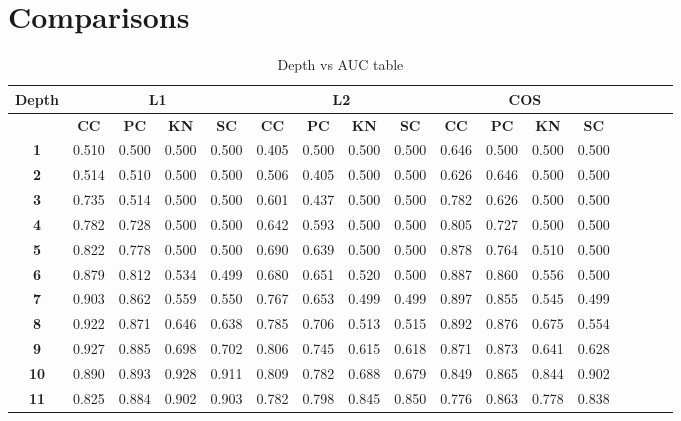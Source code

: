 \section{Comparisons}
\label{sec:comparisons}

\begin{table*}[!t]
\caption{Depth vs AUC table}
\label{comparisons:vowels}
\centering
\begin{tabular}{|c|c|c|c|c|c|c|c|c|c|c|c|c|c|c|c|c|}
\hline
\bfseries Depth & \multicolumn{4}{c|}{\textbf{L1}} & \multicolumn{4}{c|}{\textbf{L2}} & \multicolumn{4}{c|}{\textbf{COS}} \\
\hline
\bfseries  & \bfseries CC & \bfseries PC & \bfseries KN & \bfseries SC & \bfseries CC & \bfseries PC & \bfseries KN & \bfseries SC & \bfseries CC & \bfseries PC & \bfseries KN & \bfseries SC \\
\hline
\bfseries 1 & 0.510 & 0.500 & 0.500 & 0.500 & 0.405 & 0.500 & 0.500 & 0.500 & 0.646 & 0.500 & 0.500 & 0.500 \\
\hline\bfseries 2 & 0.514 & 0.510 & 0.500 & 0.500 & 0.506 & 0.405 & 0.500 & 0.500 & 0.626 & 0.646 & 0.500 & 0.500 \\
\hline\bfseries 3 & 0.735 & 0.514 & 0.500 & 0.500 & 0.601 & 0.437 & 0.500 & 0.500 & 0.782 & 0.626 & 0.500 & 0.500 \\
\hline\bfseries 4 & 0.782 & 0.728 & 0.500 & 0.500 & 0.642 & 0.593 & 0.500 & 0.500 & 0.805 & 0.727 & 0.500 & 0.500 \\
\hline\bfseries 5 & 0.822 & 0.778 & 0.500 & 0.500 & 0.690 & 0.639 & 0.500 & 0.500 & 0.878 & 0.764 & 0.510 & 0.500 \\
\hline\bfseries 6 & 0.879 & 0.812 & 0.534 & 0.499 & 0.680 & 0.651 & 0.520 & 0.500 & 0.887 & 0.860 & 0.556 & 0.500 \\
\hline\bfseries 7 & 0.903 & 0.862 & 0.559 & 0.550 & 0.767 & 0.653 & 0.499 & 0.499 & 0.897 & 0.855 & 0.545 & 0.499 \\
\hline\bfseries 8 & 0.922 & 0.871 & 0.646 & 0.638 & 0.785 & 0.706 & 0.513 & 0.515 & 0.892 & 0.876 & 0.675 & 0.554 \\
\hline\bfseries 9 & 0.927 & 0.885 & 0.698 & 0.702 & 0.806 & 0.745 & 0.615 & 0.618 & 0.871 & 0.873 & 0.641 & 0.628 \\
\hline\bfseries 10 & 0.890 & 0.893 & 0.928 & 0.911 & 0.809 & 0.782 & 0.688 & 0.679 & 0.849 & 0.865 & 0.844 & 0.902 \\
\hline\bfseries 11 & 0.825 & 0.884 & 0.902 & 0.903 & 0.782 & 0.798 & 0.845 & 0.850 & 0.776 & 0.863 & 0.778 & 0.838 \\

\end{tabular}
\end{table*}
